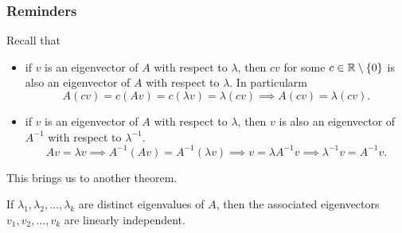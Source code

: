 \documentclass[letterpaper]{article}
\newcommand{\0}{\mathbf{0}}
\begin{document}
\subsubsection{Reminders}
Recall that 
\begin{itemize}
    \item if $v$ is an eigenvector of $A$ with respect to $\lambda$, then $cv$ for some $c \in \mathbb{R} \setminus \{0\}$ is also an eigenvector of $A$ with respect to $\lambda$. In particularm 
    \[A(cv) = c(Av) = c(\lambda v) = \lambda(cv) \implies A(cv) = \lambda(cv).\]

    \item if $v$ is an eigenvector of $A$ with respect to $\lambda$, then $v$ is also an eigenvector of $A^{-1}$ with respect to $\lambda^{-1}$. 
    \[Av = \lambda v \implies A^{-1}(Av) = A^{-1}(\lambda v) \implies v = \lambda A^{-1}v \implies \lambda^{-1} v = A^{-1} v.\]
\end{itemize}
This brings us to another theorem. 
\begin{theorem}{}{}
    If $\lambda_1, \lambda_2, \hdots, \lambda_k$ are distinct eigenvalues of $A$, then the associated eigenvectors $v_1, v_2, \hdots, v_k$ are linearly independent. 
\end{theorem}
\end{document}
